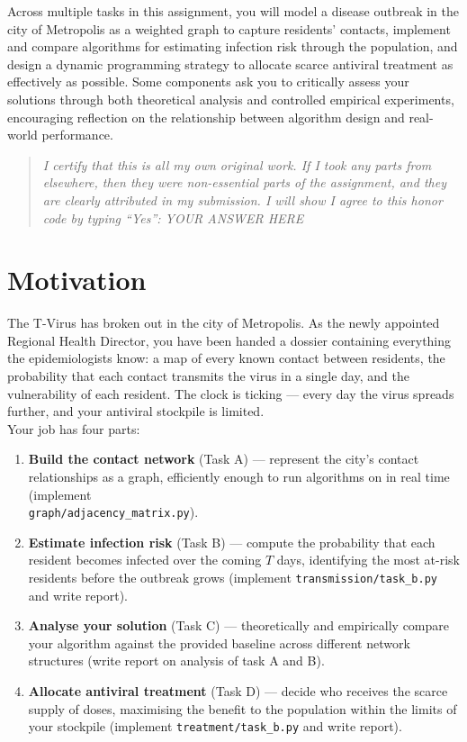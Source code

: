 \documentclass[12pt,a4paper]{article}
\begin{document}
Across multiple tasks in this assignment, you will model a disease outbreak in the city of
Metropolis as a weighted graph to capture residents' contacts, implement and compare algorithms
for estimating infection risk through the population, and design a dynamic programming strategy
to allocate scarce antiviral treatment as effectively as possible. Some components ask you to
critically assess your solutions through both theoretical analysis and controlled empirical
experiments, encouraging reflection on the relationship between algorithm design and real-world
performance.

\begin{quote}
\begin{mdframed}
\emph{I certify that this is all my own original work. If I took any parts from elsewhere,
then they were non-essential parts of the assignment, and they are clearly attributed in my
submission. I will show I agree to this honor code by typing ``Yes'': YOUR ANSWER HERE}
\end{mdframed}
\end{quote}

\newpage

\section{Motivation}

The T-Virus has broken out in the city of Metropolis. As the newly 
appointed Regional Health Director, you have been handed a dossier 
containing everything the epidemiologists know: a map of every known 
contact between residents, the probability that each contact transmits 
the virus in a single day, and the vulnerability of each resident. 
The clock is ticking --- every day the virus spreads further, and your 
antiviral stockpile is limited. \\

Your job has four parts:
\begin{enumerate}
    \item \textbf{Build the contact network} (Task A) --- represent 
          the city's contact relationships as a graph, efficiently 
          enough to run algorithms on in real time (implement \\ \texttt{graph/adjacency\_matrix.py}).
    \item \textbf{Estimate infection risk} (Task B) --- compute the 
          probability that each resident becomes infected over the 
          coming $T$ days, identifying the most at-risk residents 
          before the outbreak grows (implement \texttt{transmission/task\_b.py} and write report).
    \item \textbf{Analyse your solution} (Task C) --- theoretically 
          and empirically compare your algorithm against the provided 
          baseline across different network structures (write report on analysis of task A and B).
    \item \textbf{Allocate antiviral treatment} (Task D) --- decide 
          who receives the scarce supply of doses, maximising 
          the benefit to the population within the limits of your 
          stockpile (implement \texttt{treatment/task\_b.py} and write report).
\end{enumerate}
\end{document}
